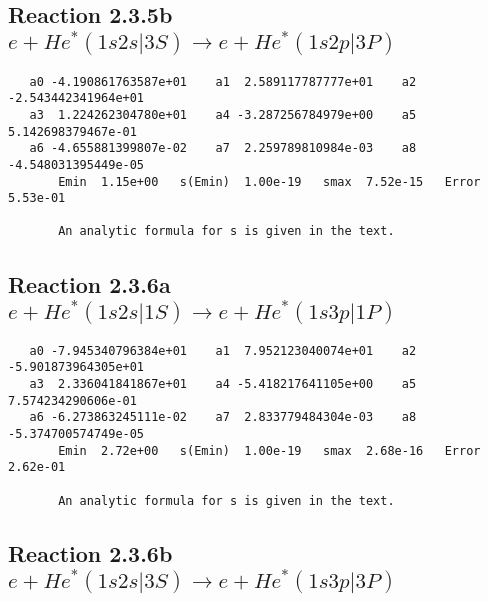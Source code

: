 \documentclass[12pt]{article}
\begin{document}
\newpage
\subsection{
Reaction 2.3.5b $   e + He^*(1s2s|3S) \rightarrow e + He^*(1s2p|3P)$}





\begin{small}\begin{verbatim}
   a0 -4.190861763587e+01    a1  2.589117787777e+01    a2 -2.543442341964e+01
   a3  1.224262304780e+01    a4 -3.287256784979e+00    a5  5.142698379467e-01
   a6 -4.655881399807e-02    a7  2.259789810984e-03    a8 -4.548031395449e-05
       Emin  1.15e+00   s(Emin)  1.00e-19   smax  7.52e-15   Error  5.53e-01

       An analytic formula for s is given in the text.
\end{verbatim}\end{small}




\newpage
\subsection{
Reaction 2.3.6a $   e + He^*(1s2s|1S) \rightarrow e + He^*(1s3p|1P)$}





\begin{small}\begin{verbatim}
   a0 -7.945340796384e+01    a1  7.952123040074e+01    a2 -5.901873964305e+01
   a3  2.336041841867e+01    a4 -5.418217641105e+00    a5  7.574234290606e-01
   a6 -6.273863245111e-02    a7  2.833779484304e-03    a8 -5.374700574749e-05
       Emin  2.72e+00   s(Emin)  1.00e-19   smax  2.68e-16   Error  2.62e-01

       An analytic formula for s is given in the text.
\end{verbatim}\end{small}




\newpage
\subsection{
Reaction 2.3.6b $  e + He^*(1s2s|3S) \rightarrow e + He^*(1s3p|3P)$}
\end{document}
